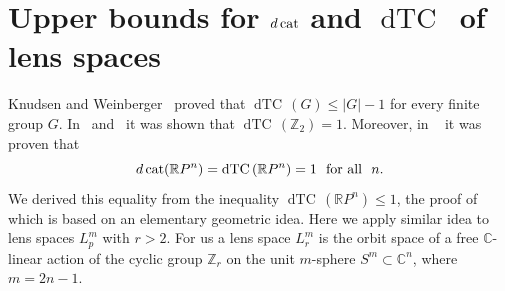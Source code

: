\documentclass{amsart}
\numberwithin{equation}{section}
\theoremstyle{plain}
\theoremstyle{definition}
\def\dTC{{\mathop\mathrm{dTC}\,}}
\def\cat{\protect\operatorname{cat}}
\begin{document}
\section{Upper bounds for $d\cat$ and $\dTC$ of lens spaces}

Knudsen and Weinberger~\cite{KW1} proved that $\dTC(G)\le |G|-1$ for every finite group $G$. In~\cite{DJ} and~\cite{KW1} it was shown that $\dTC(\mathbb Z_2)=1$.
Moreover, in ~\cite{DJ} it was proven that $$d\cat(\mathbb RP^n)=\dTC(\mathbb R P^n)=1\ \ \text{for all}\ \ n.$$ We derived this equality from the inequality $\dTC(\mathbb RP^n)\le 1$,
the proof of which is based on an elementary geometric idea. Here we apply similar idea to lens spaces $L^m_p$ with $r>2$. For us a lens space $L^m_r$ is the orbit space of a free $\mathbb C$-linear action of the cyclic group $\mathbb Z_r$ on the unit $m$-sphere $S^m\subset\mathbb C^n$, where $m=2n-1$. 
\end{document}
